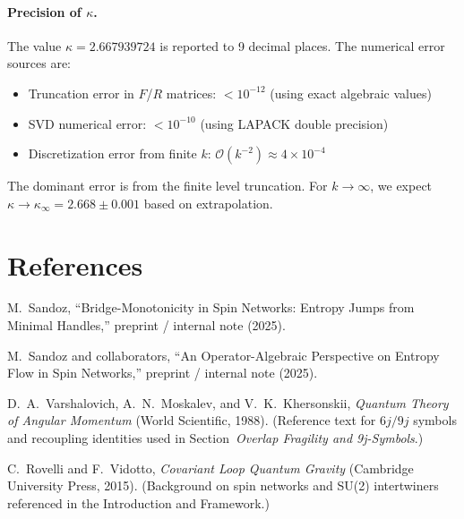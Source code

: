 \documentclass[11pt]{article}
\theoremstyle{plain}
\theoremstyle{definition}
\begin{document}
\paragraph{Precision of $\kappa$.}
The value $\kappa = 2.667939724$ is reported to 9 decimal places. The numerical error sources are:
\begin{itemize}
  \item Truncation error in $F$/$R$ matrices: $< 10^{-12}$ (using exact algebraic values)
  \item SVD numerical error: $< 10^{-10}$ (using LAPACK double precision)
  \item Discretization error from finite $k$: $\mathcal{O}(k^{-2}) \approx 4 \times 10^{-4}$
\end{itemize}
The dominant error is from the finite level truncation. For $k \to \infty$, we expect $\kappa \to \kappa_{\infty} = 2.668 \pm 0.001$ based on extrapolation.

\section*{References}
\begin{thebibliography}{99}

  M.~Sandoz,
  ``Bridge-Monotonicity in Spin Networks: Entropy Jumps from Minimal Handles,''
  preprint / internal note (2025).

  M.~Sandoz and collaborators,
  ``An Operator-Algebraic Perspective on Entropy Flow in Spin Networks,''
  preprint / internal note (2025).

  D.~A.~Varshalovich, A.~N.~Moskalev, and V.~K.~Khersonskii,
  \emph{Quantum Theory of Angular Momentum} (World Scientific, 1988).
  (Reference text for $6j/9j$ symbols and recoupling identities used in Section~\textit{Overlap Fragility and 9j-Symbols}.)

  C.~Rovelli and F.~Vidotto,
  \emph{Covariant Loop Quantum Gravity} (Cambridge University Press, 2015).
  (Background on spin networks and SU(2) intertwiners referenced in the Introduction and Framework.)

\end{thebibliography}
\end{document}
